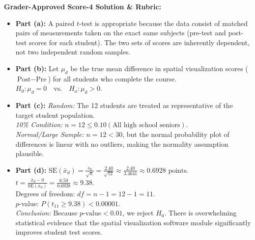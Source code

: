 \begin{frqrubricbox}
\textbf{Grader-Approved Score-4 Solution \& Rubric:}
\begin{itemize}[leftmargin=1.2em]
  \item \textbf{Part (a):} A paired $t$-test is appropriate because the data consist of matched pairs of measurements taken on the exact same subjects (pre-test and post-test scores for each student). The two sets of scores are inherently dependent, not two independent random samples.
  \item \textbf{Part (b):} Let $\mu_d$ be the true mean difference in spatial visualization scores ($\text{Post} - \text{Pre}$) for all students who complete the course.\\
  $H_0: \mu_d = 0 \quad \text{vs.} \quad H_a: \mu_d > 0$.
  \item \textbf{Part (c):}
  \textit{Random:} The 12 students are treated as representative of the target student population.\\
  \textit{10\% Condition:} $n = 12 \le 0.10(\text{All high school seniors})$.\\
  \textit{Normal/Large Sample:} $n = 12 < 30$, but the normal probability plot of differences is linear with no outliers, making the normality assumption plausible.
  \item \textbf{Part (d):}
  $\text{SE}(\bar{x}_d) = \frac{s_d}{\sqrt{n}} = \frac{2.40}{\sqrt{12}} \approx \frac{2.40}{3.4641} \approx 0.6928\text{ points}$.\\
  $t = \frac{\bar{x}_d - 0}{\text{SE}(\bar{x}_d)} = \frac{6.50}{0.6928} \approx 9.38$.\\
  Degrees of freedom: $df = n - 1 = 12 - 1 = 11$.\\
  $p$-value: $P(t_{11} \ge 9.38) < 0.00001$.\\
  \textit{Conclusion:} Because $p\text{-value} < 0.01$, we reject $H_0$. There is overwhelming statistical evidence that the spatial visualization software module significantly improves student test scores.
\end{itemize}
\end{frqrubricbox}

